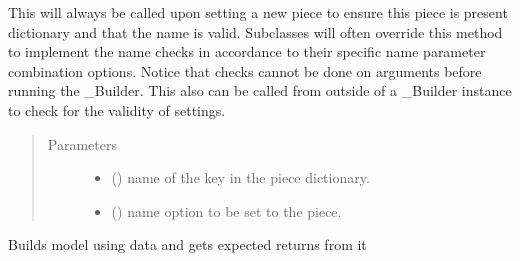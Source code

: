 \documentclass[letterpaper,10pt,english]{sphinxmanual}
\begin{document}
\begin{fulllineitems}
\begin{fulllineitems}
This will always be called upon setting a new piece to ensure this
piece is present dictionary and that the name is valid. Subclasses
will often override this method to implement the name checks in
accordance to their specific name parameter combination options.
Notice that checks cannot be done on arguments before running the
\_Builder. This also can be called from outside of a \_Builder instance
to check for the validity of settings.
\begin{quote}\begin{description}
\item[{Parameters}] \leavevmode\begin{itemize}
\item {} 
 () \textendash{} name of the key in the piece dictionary.

\item {} 
 () \textendash{} name option to be set to the piece.

\end{itemize}

\end{description}\end{quote}

\end{fulllineitems}


\begin{fulllineitems}
\label{\detokenize{dalio.pipe:dalio.pipe.ExpectedReturns.transform}}
Builds model using data and gets expected returns from it

\end{fulllineitems}


\end{fulllineitems}

\end{document}
